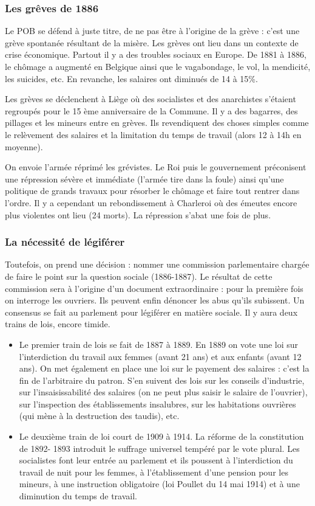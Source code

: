 \documentclass[12pt]{report}
\begin{document}
\subsubsection{Les grêves de 1886}

Le POB se défend à juste titre, de ne pas être à l’origine de la grève : c’est une grève
spontanée résultant de la misère. Les grèves ont lieu dans un contexte de crise économique.
Partout il y a des troubles sociaux en Europe. De 1881 à 1886, le chômage a augmenté en
Belgique ainsi que le vagabondage, le vol, la mendicité, les suicides, etc. En revanche, les
salaires ont diminués de 14 à 15\%.

Les grèves se déclenchent à Liège où des socialistes et des anarchistes s’étaient regroupés
pour le 15 ème anniversaire de la Commune. Il y a des bagarres, des pillages et les mineurs
entre en grèves. Ils revendiquent des choses simples comme le relèvement des salaires et la
limitation du temps de travail (alors 12 à 14h en moyenne).

On envoie l’armée réprimé les grévistes. Le Roi puis le gouvernement préconisent une
répression sévère et immédiate (l’armée tire dans la foule) ainsi qu’une politique de grands
travaux pour résorber le chômage et faire tout rentrer dans l’ordre. Il y a cependant un
rebondissement à Charleroi où des émeutes encore plus violentes ont lieu (24 morts). La
répression s’abat une fois de plus.

\subsubsection{La nécessité de légiférer}

Toutefois, on prend une décision : nommer une commission parlementaire chargée de faire le
point sur la question sociale (1886-1887). Le résultat de cette commission sera à l’origine
d’un document extraordinaire : pour la première fois on interroge les ouvriers. Ils peuvent
enfin dénoncer les abus qu’ils subissent. Un consensus se fait au parlement pour légiférer en
matière sociale. Il y aura deux trains de lois, encore timide.

\begin{itemize}
	\item Le premier train de lois se fait de 1887 à 1889. En 1889 on vote une loi sur
l’interdiction du travail aux femmes (avant 21 ans) et aux enfants (avant 12 ans). On
met également en place une loi sur le payement des salaires : c’est la fin de l’arbitraire
du patron. S’en suivent des lois sur les conseils d’industrie, sur l’insaisissabilité des
salaires (on ne peut plus saisir le salaire de l’ouvrier), sur l’inspection des
établissements insalubres, sur les habitations ouvrières (qui mène à la destruction des
taudis), etc.
\item Le deuxième train de loi court de 1909 à 1914. La réforme de la constitution de 1892-
1893 introduit le suffrage universel tempéré par le vote plural. Les socialistes font leur
entrée au parlement et ils poussent à l’interdiction du travail de nuit pour les femmes,
à l’établissement d’une pension pour les mineurs, à une instruction obligatoire (loi
Poullet du 14 mai 1914) et à une diminution du temps de travail.
\end{itemize}
\end{document}
